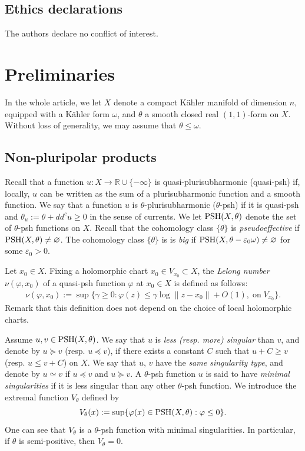\documentclass[a4paper]{amsart}
\numberwithin{equation}{section}
\theoremstyle{definition}
\newcommand{\ddc}{dd^c}
\numberwithin{equation}{section}
\newcommand{\PSH}{{\rm PSH}}
\begin{document}
\subsection*{Ethics declarations} The authors declare no conflict of interest.
\section{Preliminaries}
In the whole article, we let $X$ denote a compact K\"ahler manifold of dimension $n$, equipped with a K\"ahler form $\omega$, and $\theta$ a smooth closed real $(1,1)$-form on $X$. Without loss of generality, we may assume that $\theta\leq \omega$.
\subsection{Non-pluripolar products}
Recall that a function $u:X\to\mathbb{R}\cup\{-\infty\}$ is quasi-plurisubharmonic
(quasi-psh) if, locally, $u$ can be written as the sum of a plurisubharmonic function and a smooth function. 
We say that a function $u$ is $\theta$-plurisubharmonic ($\theta$-psh) if it is quasi-psh and $\theta_u:=\theta+\ddc u\geq 0$ in the sense of currents.  We let $\PSH(X, \theta)$ denote the set of $\theta$-psh functions on $X$. Recall that
the cohomology class $\{\theta\}$ is {\em pseudoeffective} if $\PSH(X,\theta)\neq \varnothing$. 
 The cohomology class $\{\theta\}$ is is {\em big} if $\PSH(X,\theta-\varepsilon_0\omega)\neq \varnothing$ for some $\varepsilon_0>0$.

 
Let $x_0\in X$. Fixing a holomorphic chart $x_0\in V_{x_0}\subset X$,  the {\em Lelong number} $\nu(\varphi,x_0)$ of a quasi-psh function $\varphi$ at  $x_0\in X$ is defined as follows:
		\begin{align*}
		\nu(\varphi,x_0):=\sup\{\gamma\geq 0: \varphi(z)\leq \gamma\log\|z-x_0\|+O(1), \; \text{on}\; V_{x_0}\}.  
		\end{align*}
 Remark that this definition does not depend on the choice of local holomorphic charts.


\smallskip

Assume $u,v\in \PSH(X,\theta)$. We say that $u$ is {\it less (resp. more) singular} than $v$, and denote by $u\succeq v$ (resp. $u \preceq v$), if there exists a constant $C$ such that $u+C\geq v$ (resp. $u\leq v+C$) on $X$. We say that $u$, $v$ have the {\em same singularity type}, and denote by $u\simeq v$ if $u \preceq v$ and $u\succeq v$.
A $\theta$-psh function $u$ is said to have {\em minimal singularities} if it is less singular than any other $\theta$-psh function.
We introduce the extremal function $V_\theta$ defined by
\[ V_\theta(x):=\sup\{\varphi(x)\in\PSH(X,\theta): \varphi\leq 0 \}.\]
One can see that $V_\theta$ is a $\theta$-psh function with minimal singularities. 
In particular, if $\theta$ is semi-positive, then $V_\theta=0$.
\end{document}
